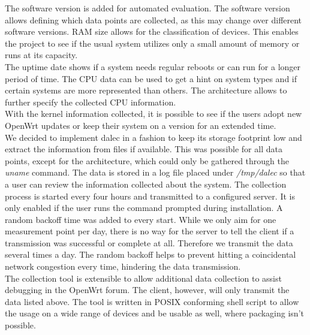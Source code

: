     The software version is added for automated evaluation. The software version allows defining which data points are collected, as this may change over different software versions. RAM size allows for the classification of devices. This enables the project to see if the usual system utilizes only a small amount of memory or runs at its capacity.\\
    The uptime date shows if a system needs regular reboots or can run for a longer period of time. The CPU data can be used to get a hint on system types and if certain systems are more represented than others. The architecture allows to further specify the collected CPU information.\\
    With the kernel information collected, it is possible to see if the users adopt new OpenWrt updates or keep their system on a version for an extended time.\\
    
    We decided to implement dalec in a fashion to keep its storage footprint low and extract the information from files if available. This was possible for all data points, except for the architecture, which could only be gathered through the \textit{uname} command. The data is stored in a log file placed under \textit{/tmp/dalec} so that a user can review the information collected about the system. The collection process is started every four hours and transmitted to a configured server. It is only enabled if the user runs the command prompted during installation. A random backoff time was added to every start. While we only aim for one measurement point per day, there is no way for the server to tell the client if a transmission was successful or complete at all. Therefore we transmit the data several times a day. The random backoff helps to prevent hitting a coincidental network congestion every time, hindering the data transmission.\\
    The collection tool is extensible to allow additional data collection to assist debugging in the OpenWrt forum. The client, however, will only transmit the data listed above. The tool is written in POSIX conforming shell script to allow the usage on a wide range of devices and be usable as well, where packaging isn't possible.
%
